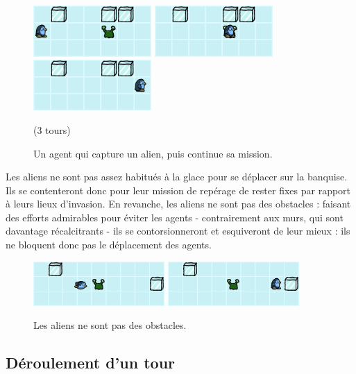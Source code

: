 \begin{figure}[!h]
    \centering
    \includegraphics[width=4.5cm]{img/alien_capture1}
    \includegraphics[width=4.5cm]{img/alien_capture2}
    \includegraphics[width=4.5cm]{img/alien_capture3}
    \vspace{-0.3cm}
    \caption*{(3 tours)}
    \caption*{Un agent qui capture un alien, puis continue sa mission.}
\end{figure}

Les aliens ne sont pas assez habitués à la glace pour se déplacer sur
la banquise. Ils se contenteront donc pour leur mission de repérage de
rester fixes par rapport à leurs lieux d'invasion. En revanche, les
aliens ne sont pas des obstacles : faisant des efforts admirables pour
éviter les agents - contrairement aux murs, qui sont davantage
récalcitrants - ils se contorsionneront et esquiveront de leur mieux :
ils ne bloquent donc pas le déplacement des agents.

\begin{figure}[!h]
    \centering
    \includegraphics[width=5cm]{img/alien_not_obstacle1}
    \hspace{0.5cm}
    \includegraphics[width=5cm]{img/alien_not_obstacle2}
    \caption*{Les aliens ne sont pas des obstacles.}
\end{figure}

\newpage
\subsection{Déroulement d'un tour}\label{duxe9roulement-dun-tour}

